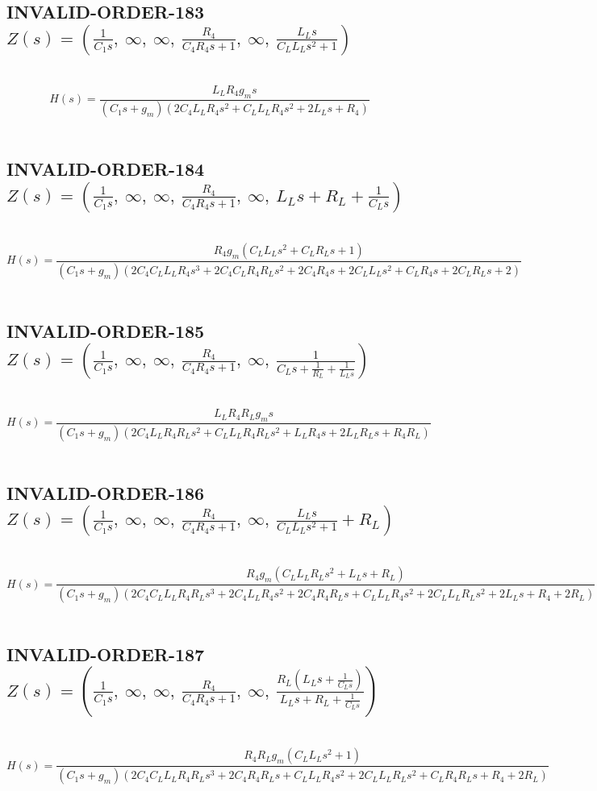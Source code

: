 \documentclass{article}
\begin{document}
\subsection{INVALID-ORDER-183 $Z(s) = \left( \frac{1}{C_{1} s}, \  \infty, \  \infty, \  \frac{R_{4}}{C_{4} R_{4} s + 1}, \  \infty, \  \frac{L_{L} s}{C_{L} L_{L} s^{2} + 1}\right)$ } \ 
\textbf{\[H(s) = \frac{L_{L} R_{4} g_{m} s}{\left(C_{1} s + g_{m}\right) \left(2 C_{4} L_{L} R_{4} s^{2} + C_{L} L_{L} R_{4} s^{2} + 2 L_{L} s + R_{4}\right)}\] } \ 
\subsection{INVALID-ORDER-184 $Z(s) = \left( \frac{1}{C_{1} s}, \  \infty, \  \infty, \  \frac{R_{4}}{C_{4} R_{4} s + 1}, \  \infty, \  L_{L} s + R_{L} + \frac{1}{C_{L} s}\right)$ } \ 
\textbf{\[H(s) = \frac{R_{4} g_{m} \left(C_{L} L_{L} s^{2} + C_{L} R_{L} s + 1\right)}{\left(C_{1} s + g_{m}\right) \left(2 C_{4} C_{L} L_{L} R_{4} s^{3} + 2 C_{4} C_{L} R_{4} R_{L} s^{2} + 2 C_{4} R_{4} s + 2 C_{L} L_{L} s^{2} + C_{L} R_{4} s + 2 C_{L} R_{L} s + 2\right)}\] } \ 
\subsection{INVALID-ORDER-185 $Z(s) = \left( \frac{1}{C_{1} s}, \  \infty, \  \infty, \  \frac{R_{4}}{C_{4} R_{4} s + 1}, \  \infty, \  \frac{1}{C_{L} s + \frac{1}{R_{L}} + \frac{1}{L_{L} s}}\right)$ } \ 
\textbf{\[H(s) = \frac{L_{L} R_{4} R_{L} g_{m} s}{\left(C_{1} s + g_{m}\right) \left(2 C_{4} L_{L} R_{4} R_{L} s^{2} + C_{L} L_{L} R_{4} R_{L} s^{2} + L_{L} R_{4} s + 2 L_{L} R_{L} s + R_{4} R_{L}\right)}\] } \ 
\subsection{INVALID-ORDER-186 $Z(s) = \left( \frac{1}{C_{1} s}, \  \infty, \  \infty, \  \frac{R_{4}}{C_{4} R_{4} s + 1}, \  \infty, \  \frac{L_{L} s}{C_{L} L_{L} s^{2} + 1} + R_{L}\right)$ } \ 
\textbf{\[H(s) = \frac{R_{4} g_{m} \left(C_{L} L_{L} R_{L} s^{2} + L_{L} s + R_{L}\right)}{\left(C_{1} s + g_{m}\right) \left(2 C_{4} C_{L} L_{L} R_{4} R_{L} s^{3} + 2 C_{4} L_{L} R_{4} s^{2} + 2 C_{4} R_{4} R_{L} s + C_{L} L_{L} R_{4} s^{2} + 2 C_{L} L_{L} R_{L} s^{2} + 2 L_{L} s + R_{4} + 2 R_{L}\right)}\] } \ 
\subsection{INVALID-ORDER-187 $Z(s) = \left( \frac{1}{C_{1} s}, \  \infty, \  \infty, \  \frac{R_{4}}{C_{4} R_{4} s + 1}, \  \infty, \  \frac{R_{L} \left(L_{L} s + \frac{1}{C_{L} s}\right)}{L_{L} s + R_{L} + \frac{1}{C_{L} s}}\right)$ } \ 
\textbf{\[H(s) = \frac{R_{4} R_{L} g_{m} \left(C_{L} L_{L} s^{2} + 1\right)}{\left(C_{1} s + g_{m}\right) \left(2 C_{4} C_{L} L_{L} R_{4} R_{L} s^{3} + 2 C_{4} R_{4} R_{L} s + C_{L} L_{L} R_{4} s^{2} + 2 C_{L} L_{L} R_{L} s^{2} + C_{L} R_{4} R_{L} s + R_{4} + 2 R_{L}\right)}\] } \ 
\end{document}
